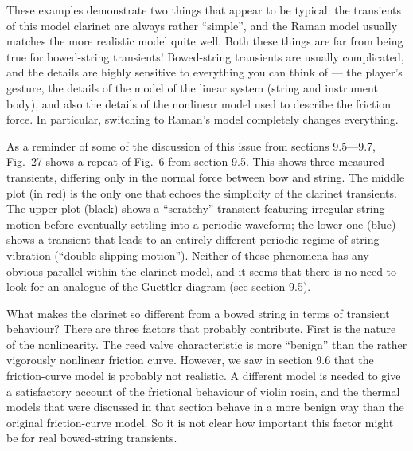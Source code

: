 
  These examples demonstrate two things that appear to be typical: the 
  transients of this model clarinet are always rather “simple”, and the Raman 
  model usually matches the more realistic model quite well. Both these things 
  are far from being true for bowed-string transients! Bowed-string transients 
  are usually complicated, and the details are highly sensitive to everything 
  you can think of — the player’s gesture, the details of the model of the 
  linear system (string and instrument body), and also the details of the 
  nonlinear model used to describe the friction force. In particular, switching 
  to Raman's model completely changes everything. 

  As a reminder of some of the discussion of this issue from sections 9.5—9.7, 
  Fig.\ 27 shows a repeat of Fig.\ 6 from section 9.5. This shows three 
  measured transients, differing only in the normal force between bow and 
  string. The middle plot (in red) is the only one that echoes the simplicity 
  of the clarinet transients. The upper plot (black) shows a “scratchy” 
  transient featuring irregular string motion before eventually settling into a 
  periodic waveform; the lower one (blue) shows a transient that leads to an 
  entirely different periodic regime of string vibration (“double-slipping 
  motion”). Neither of these phenomena has any obvious parallel within the 
  clarinet model, and it seems that there is no need to look for an analogue of 
  the Guettler diagram (see section 9.5). 


  What makes the clarinet so different from a bowed string in terms of 
  transient behaviour? There are three factors that probably contribute. First 
  is the nature of the nonlinearity. The reed valve characteristic is more 
  ``benign'' than the rather vigorously nonlinear friction curve. However, we 
  saw in section 9.6 that the friction-curve model is probably not realistic. A 
  different model is needed to give a satisfactory account of the frictional 
  behaviour of violin rosin, and the thermal models that were discussed in that 
  section behave in a more benign way than the original friction-curve model. 
  So it is not clear how important this factor might be for real bowed-string 
  transients. 

